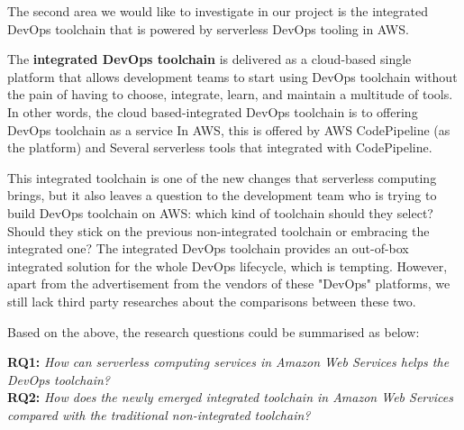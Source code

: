 \par
The second area we would like to investigate in our project is the integrated DevOps toolchain that is powered by serverless DevOps tooling in AWS. 
\par
The \textbf{integrated DevOps toolchain} is delivered as a cloud-based single platform that allows development teams to start using DevOps toolchain without the pain of having to choose, integrate, learn, and maintain a multitude of tools. In other words, the cloud based-integrated DevOps toolchain is to offering DevOps toolchain as a service
In AWS, this is offered by AWS CodePipeline (as the platform) and Several serverless tools that integrated with CodePipeline.
\par
This integrated toolchain is one of the new changes that serverless computing brings, but it also leaves a question to the development team who is trying to build DevOps toolchain on AWS: which kind of toolchain should they select? Should they stick on the previous non-integrated toolchain or embracing the integrated one? The integrated DevOps toolchain provides an out-of-box integrated solution for the whole DevOps lifecycle, which is tempting. However, apart from the advertisement from the vendors of these "DevOps" platforms, we still lack third party researches about the comparisons between these two. 
\par
Based on the above, the research questions could be summarised as below: 
\par
\textbf{RQ1:} \textit{How can serverless computing services in Amazon Web Services helps the DevOps toolchain?} \\
\textbf{RQ2:} \textit{How does the newly emerged integrated toolchain in Amazon Web Services compared with the traditional non-integrated toolchain?}
